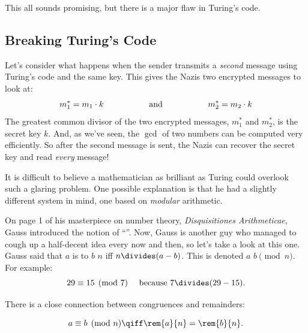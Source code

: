 This all sounds promising, but there is a major flaw in Turing's code.

\subsection{Breaking Turing's Code}

Let's consider what happens when the sender transmits a
\emph{second} message using Turing's code and the same key.  This
gives the Nazis two encrypted messages to look at:
%
\[
m_1^* = m_1 \cdot k
\hspace{0.75in} \text{and} \hspace{0.75in}
m_2^* = m_2 \cdot k
\]
%
The greatest common divisor of the two encrypted messages, $m_1^*$ and
$m_2^*$, is the secret key $k$.  And, as we've seen, the $\gcd$ of two
numbers can be computed very efficiently.  So after the second message is
sent, the Nazis can recover the secret key and read \emph{every}
message!

It is difficult to believe a mathematician as brilliant as Turing
could overlook such a glaring problem.  One possible explanation is
that he had a slightly different system in mind, one based on
\emph{modular} arithmetic.



\label{sec:modular-arithmeric}


On page 1 of his masterpiece on number theory, \emph{Disquisitiones
  Arithmeticae}, Gauss introduced the notion of ``''.
Now, Gauss is another guy who managed to cough up a half-decent idea every
now and then, so let's take a look at this one.  Gauss said that $a$
  is  to $b$  $n$ iff $n \divides (a - b)$.  This is
denoted $a$  $b \pmod{n}$.  For example:
%
\[
29 \equiv 15 \pmod{7}  \quad\text{ because }  7 \divides (29 - 15).
\]

There is a close connection between congruences and remainders:
\begin{lemma}
\label{lem:conrem}
\[
a \equiv b \pmod{n} \qiff \rem{a}{n} = \rem{b}{n}.
\]
\end{lemma}

